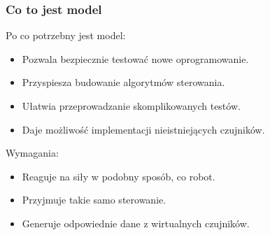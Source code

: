 \documentclass{beamer}
\begin{document}
	\begin{frame}
		\frametitle{Co to jest model}
		Po co potrzebny jest model:
		\begin{itemize}
		 \item Pozwala bezpiecznie testować nowe oprogramowanie.
		 \item Przyspiesza budowanie algorytmów sterowania.
		 \item Ułatwia przeprowadzanie skomplikowanych testów.
		 \item Daje możliwość implementacji nieistniejących czujników.
		\end{itemize}
		Wymagania:
		\begin{itemize}
		 \item Reaguje na siły w podobny sposób, co robot.
		 \item Przyjmuje takie samo sterowanie.
		 \item Generuje odpowiednie dane z wirtualnych czujników.
		\end{itemize}
	\end{frame}
	
\end{document}
